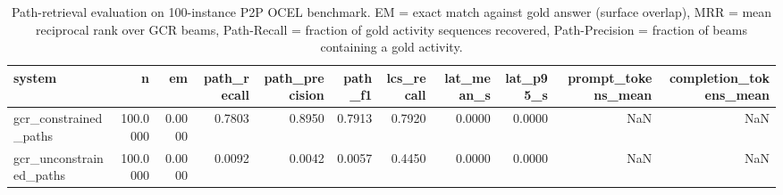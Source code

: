 \begin{table}
\caption{Path-retrieval evaluation on 100-instance P2P OCEL benchmark. EM = exact match against gold answer (surface overlap), MRR = mean reciprocal rank over GCR beams, Path-Recall = fraction of gold activity sequences recovered, Path-Precision = fraction of beams containing a gold activity.}
\label{tab:path_results}
\begin{tabular}{lrrrrrrrrrr}
\toprule
system & n & em & path_recall & path_precision & path_f1 & lcs_recall & lat_mean_s & lat_p95_s & prompt_tokens_mean & completion_tokens_mean \\
\midrule
gcr_constrained_paths & 100.0000 & 0.0000 & 0.7803 & 0.8950 & 0.7913 & 0.7920 & 0.0000 & 0.0000 & NaN & NaN \\
gcr_unconstrained_paths & 100.0000 & 0.0000 & 0.0092 & 0.0042 & 0.0057 & 0.4450 & 0.0000 & 0.0000 & NaN & NaN \\
\bottomrule
\end{tabular}
\end{table}
